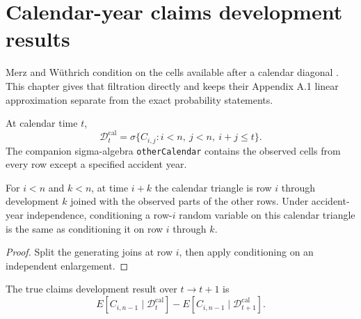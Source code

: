 \chapter{Calendar-year claims development results}

Merz and W\"uthrich condition on the cells available after a calendar diagonal
\cite{MerzWuethrich2008}. This chapter gives that filtration directly and keeps
their Appendix A.1 linear approximation separate from the exact probability
statements.

\begin{definition}\label{def:calendarSigma}\leanok
At calendar time $t$,
\[
 \mathcal D^{\mathrm{cal}}_t
 = \sigma\{C_{i,j}: i<n,\ j<n,\ i+j\le t\}.
\]
The companion sigma-algebra \texttt{otherCalendar} contains the observed cells
from every row except a specified accident year.
\end{definition}

\begin{theorem}\label{thm:calendarSplit}\leanok
{}
For $i<n$ and $k<n$, at time $i+k$ the calendar triangle is row $i$ through development
$k$ joined with the observed parts of the other rows. Under accident-year independence,
conditioning a row-$i$ random variable on this calendar triangle is the same as
conditioning it on row $i$ through $k$.
\end{theorem}
\begin{proof}\leanok Split the generating joins at row $i$, then apply conditioning on an independent enlargement.\end{proof}

\begin{definition}\label{def:calendarCDR}\leanok
The true claims development result over $t\to t+1$ is
\[
 E[C_{i,n-1}\mid\mathcal D^{\mathrm{cal}}_t]
 -E[C_{i,n-1}\mid\mathcal D^{\mathrm{cal}}_{t+1}].
\]
\end{definition}

